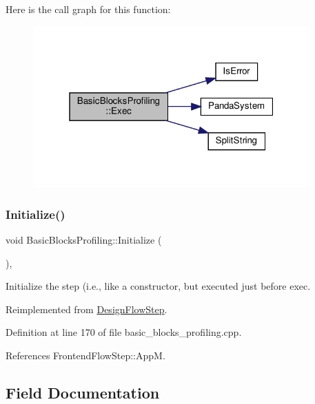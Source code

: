 Here is the call graph for this function\+:
\nopagebreak
\begin{figure}[H]
\begin{center}
\leavevmode
\includegraphics[width=301pt]{dc/d17/classBasicBlocksProfiling_a3a818424991cbd10f25d89e2f2d0417d_cgraph}
\end{center}
\end{figure}
\mbox{\label{classBasicBlocksProfiling_a3d2004d81a84529f1048fcc66c6a61d0}} 
\subsubsection{\texorpdfstring{Initialize()}{Initialize()}}
{\footnotesize\ttfamily void Basic\+Blocks\+Profiling\+::\+Initialize (\begin{DoxyParamCaption}{ }\end{DoxyParamCaption})\hspace{0.3cm}{\ttfamily [override]}, {\ttfamily [virtual]}}



Initialize the step (i.\+e., like a constructor, but executed just before exec. 



Reimplemented from \hyperlink{classDesignFlowStep_a44b50683382a094976e1d432a7784799}{Design\+Flow\+Step}.



Definition at line 170 of file basic\+\_\+blocks\+\_\+profiling.\+cpp.



References Frontend\+Flow\+Step\+::\+AppM.



\subsection{Field Documentation}
\mbox{\label{classBasicBlocksProfiling_a0b68176254963c56ee768ef7ace7f185}} 
